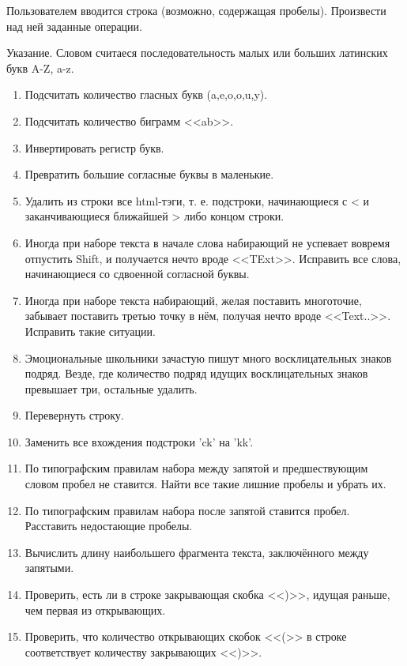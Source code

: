 
\labtask

Пользователем вводится строка (возможно, содержащая пробелы).
Произвести над ней заданные операции.

Указание. Словом считаеся последовательность малых или больших латинских букв A-Z, a-z.

\begin{enumerate}
	\item
		Подсчитать количество гласных букв (a,e,o,o,u,y).
	\item
		Подсчитать количество биграмм <<ab>>.
	\item
		Инвертировать регистр букв.
	\item
		Превратить большие согласные буквы в маленькие.
	\item
		Удалить из строки все html-тэги, т. е. подстроки, начинающиеся с < и заканчивающиеся ближайшей > либо концом строки.
	\item
		Иногда при наборе текста в начале слова набирающий не успевает вовремя отпустить Shift, и получается нечто вроде <<TExt>>.
		Исправить все слова, начинающиеся со сдвоенной согласной буквы.
	\item
		Иногда при наборе текста набирающий, желая поставить многоточие, забывает поставить третью точку в нём, получая нечто вроде <<Text..>>.
		Исправить такие ситуации.
	\item
		Эмоциональные школьники зачастую пишут много восклицательных знаков подряд.
		Везде, где количество подряд идущих восклицательных знаков превышает три, остальные удалить.
	\item
		Перевернуть строку.
	\item
		Заменить все вхождения подстроки 'ck' на 'kk'.
	\item
		По типографским правилам набора между запятой и предшествующим словом пробел не ставится.
		Найти все такие лишние пробелы и убрать их.
	\item
		По типографским правилам набора после запятой ставится пробел.
		Расставить недостающие пробелы.		
	\item
		Вычислить длину наибольшего фрагмента текста, заключённого между запятыми.
	\item
		Проверить, есть ли в строке закрывающая скобка <<)>>, идущая раньше, чем первая из открывающих.
	\item
		Проверить, что количество открывающих скобок <<(>> в строке соответствует количеству закрывающих <<)>>.

\end{enumerate}

